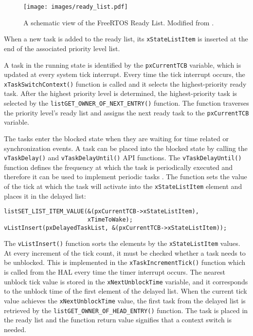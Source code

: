 \begin{figure}[ht]
    \centering
    \texttt{[image: images/ready\_list.pdf]}
    \caption{A schematic view of the FreeRTOS Ready List. Modified from \cite{brown2012architecture}.}
    \label{freertos:ready}
\end{figure}
When a new task is added to the ready list, its \verb$xStateListItem$ is inserted at the end of the 
associated priority level list.

A task in the running state is identified by the \verb$pxCurrentTCB$ variable, which is updated at every system tick interrupt. 
Every time the tick interrupt occurs, the \verb$xTaskSwitchContext()$ function is called and it selects the highest-priority ready task.
After the highest priority level is determined,
the highest-priority task is selected by the \verb$listGET_OWNER_OF_NEXT_ENTRY()$ function.
The function traverses the priority level's ready list and assigns the next ready task to the \verb$pxCurrentTCB$ variable.

The tasks enter the blocked state when they are waiting for time related or synchronization events. 
A task can be placed into the blocked state by calling the \verb$vTaskDelay()$ and \verb$vTaskDelayUntil()$ API functions. 
The \verb$vTaskDelayUntil()$ function defines the frequency at which the task is periodically executed and therefore it can be used to implement periodic tasks \cite{carraro2016implementation}.
The function sets the value of the tick at which the task will activate into the \verb$xStateListItem$ element and places it in the delayed list:
\begin{lstlisting}[frame=none, label={lst:delay}, caption={Transition to blocked state.}, captionpos=b]
listSET_LIST_ITEM_VALUE(&(pxCurrentTCB->xStateListItem), 
						xTimeToWake);
vListInsert(pxDelayedTaskList, &(pxCurrentTCB->xStateListItem));
\end{lstlisting}
The \verb$vListInsert()$ function sorts the elements by the \verb$xStateListItem$ values. 
At every increment of the tick count, it must be checked whether a task needs to be unblocked. 
This is implemented in the \verb$xTaskIncrementTick()$ function which is called from the HAL every time the timer interrupt occurs.
The nearest unblock tick value is stored in the \verb$xNextUnblockTime$ variable, and it corresponds to the unblock time of the first element of the delayed list.
When the current tick value achieves the \verb$xNextUnblockTime$ value, the first task from the delayed list is retrieved by the \verb$listGET_OWNER_OF_HEAD_ENTRY()$ function.
The task is placed in the ready list and the function return value signifies that a context switch is needed.

